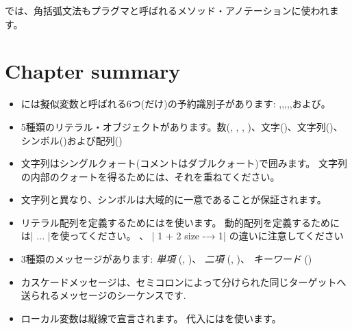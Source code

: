 \documentclass[a4paper,10pt,twoside]{book}
\begin{document}


\pharo では、角括弧文法もプラグマと呼ばれるメソッド・アノテーションに使われます。

\section{Chapter summary}

\begin{itemize}

\item	\pharo には擬似変数と呼ばれる6つ(だけ)の予約識別子があります: ,,,,,および。

\item	5種類のリテラル・オブジェクトがあります。数(, , , )、文字()、文字列()、シンボル()および配列()

\item	文字列はシングルクォート(コメントはダブルクォート)で囲みます。
		文字列の内部のクォートを得るためには、それを重ねてください。

\item	文字列と異なり、シンボルは大域的に一意であることが保証されます。

\item	リテラル配列を定義するためにはを使います。
		動的配列を定義するためには\ct|{ ... }|を使ってください。
		、
		\ct|{ 1 + 2 } size -→ 1|
		の違いに注意してください

\item	3種類のメッセージがあります:
		\emph{単項} (\eg {}, )、
		\emph{二項} (\eg {}, )、
		\emph{キーワード} (\eg {})

\item	カスケードメッセージは、セミコロンによって分けられた同じターゲットへ送られるメッセージのシーケンスです.

\item	ローカル変数は縦線で宣言されます。
		代入には\ct{:=}を使います。


\end{itemize}
\end{document}
